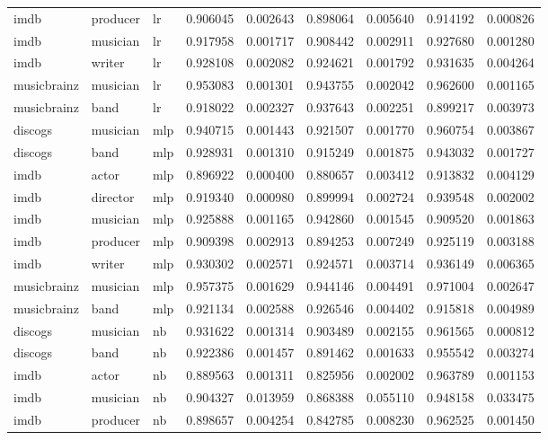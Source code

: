 \documentclass[epsfig,a4paper,11pt,titlepage,twoside,openany]{book}
\begin{document}
\begin{longtable}{|l|l|l|l|l|l|l|l|l|}
imdb        & producer & lr    & 0.906045 & 0.002643 & 0.898064  & 0.005640 & 0.914192 & 0.000826 \\
imdb        & musician & lr    & 0.917958 & 0.001717 & 0.908442  & 0.002911 & 0.927680 & 0.001280 \\
imdb        & writer   & lr    & 0.928108 & 0.002082 & 0.924621  & 0.001792 & 0.931635 & 0.004264 \\
musicbrainz & musician & lr    & 0.953083 & 0.001301 & 0.943755  & 0.002042 & 0.962600 & 0.001165 \\ 
musicbrainz & band     & lr    & 0.918022 & 0.002327 & 0.937643  & 0.002251 & 0.899217 & 0.003973 \\ \hline
discogs     & musician & mlp   & 0.940715 & 0.001443 & 0.921507  & 0.001770 & 0.960754 & 0.003867 \\
discogs     & band     & mlp   & 0.928931 & 0.001310 & 0.915249  & 0.001875 & 0.943032 & 0.001727 \\
imdb        & actor    & mlp   & 0.896922 & 0.000400 & 0.880657  & 0.003412 & 0.913832 & 0.004129 \\
imdb        & director & mlp   & 0.919340 & 0.000980 & 0.899994  & 0.002724 & 0.939548 & 0.002002 \\
imdb        & musician & mlp   & 0.925888 & 0.001165 & 0.942860  & 0.001545 & 0.909520 & 0.001863 \\
imdb        & producer & mlp   & 0.909398 & 0.002913 & 0.894253  & 0.007249 & 0.925119 & 0.003188 \\
imdb        & writer   & mlp   & 0.930302 & 0.002571 & 0.924571  & 0.003714 & 0.936149 & 0.006365 \\
musicbrainz & musician & mlp   & 0.957375 & 0.001629 & 0.944146  & 0.004491 & 0.971004 & 0.002647 \\ 
musicbrainz & band     & mlp   & 0.921134 & 0.002588 & 0.926546  & 0.004402 & 0.915818 & 0.004989 \\ \hline
discogs     & musician & nb    & 0.931622 & 0.001314 & 0.903489  & 0.002155 & 0.961565 & 0.000812 \\
discogs     & band     & nb    & 0.922386 & 0.001457 & 0.891462  & 0.001633 & 0.955542 & 0.003274 \\
imdb        & actor    & nb    & 0.889563 & 0.001311 & 0.825956  & 0.002002 & 0.963789 & 0.001153 \\
imdb        & musician & nb    & 0.904327 & 0.013959 & 0.868388  & 0.055110 & 0.948158 & 0.033475 \\
imdb        & producer & nb    & 0.898657 & 0.004254 & 0.842785  & 0.008230 & 0.962525 & 0.001450 \\

\end{longtable}
\end{document}
